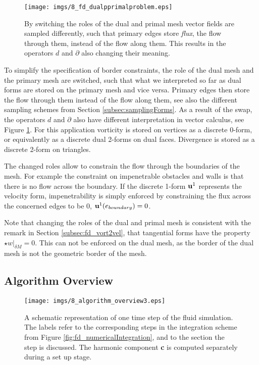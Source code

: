 \begin{figure}%
\texttt{[image: imgs/8\_fd\_dualpprimalproblem.eps]}%
\caption{By switching the roles of the dual and primal mesh vector fields are sampled differently, such that primary edges store \emph{flux}, the flow through them, instead of the flow along them. This results in the operators $d$ and $\partial$ also changing their meaning.}%
\label{fig:fd_whoiswho}%
\end{figure}

To simplify the specification of border constraints, the role of the dual mesh and the primary mesh are switched, such that what we interpreted so far as dual forms are stored on the primary mesh and vice versa.  Primary edges then store the flow through them instead of the flow along them, see also the different sampling schemes from Section \ref{subsec:samplingForms}. As a result of the swap, the operators $d$ and $\partial$ also have  different interpretation in vector calculus, see Figure \ref{fig:fd_whoiswho}. For this application vorticity is stored on vertices as a discrete $0$-form, or equivalently as a discrete dual 2-forms on dual faces. Divergence is stored as a discrete 2-form on triangles.

The changed roles allow to constrain the flow through the boundaries of the mesh. For example the constraint on impenetrable obstacles and walls is that there is no flow across the boundary. If the discrete 1-form $\textbf{u}^1$ represents the velocity form, impenetrability is simply enforced by constraining the flux across the concerned edges to be 0, $\textbf{u}^1(e_{boundary}) = 0$.

Note that changing the roles of the dual and primal mesh is consistent with the remark in Section \ref{subsec:fd_vort2vel}, that tangential forms have the property $\star w |_{\delta M} = 0 $. This can not be enforced on the dual mesh, as the border of the dual mesh is not the geometric border of the mesh. %

\subsection{Algorithm Overview}
\label{sec:fd_algoverview}

\begin{figure}%
\begin{center}
\vspace{-0.1cm}
\texttt{[image: imgs/8\_algorithm\_overview3.eps]}%
\end{center}
\vspace{-0.5cm}
\caption{A schematic representation of one time step of the fluid simulation. The labels refer to the corresponding steps in the integration scheme from Figure \ref{fig:fd_numericalIntegration}, and to the section the step is discussed. The harmonic component \textbf{c} is computed separately during a set up stage.}%
\vspace{-0.3cm}
\label{fig:fd_algorithm}%
\end{figure}

